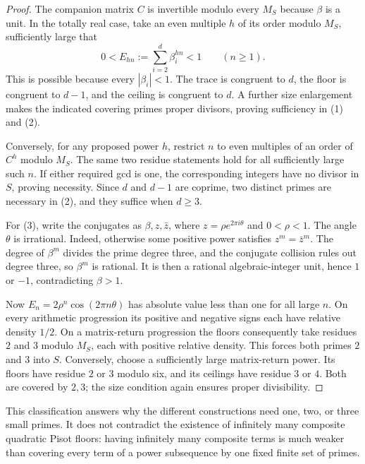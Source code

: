 \documentclass[11pt,a4paper]{article}
\theoremstyle{definition}
\theoremstyle{remark}
\numberwithin{equation}{section}
\begin{document}
\begin{proof}
The companion matrix $C$ is invertible modulo every $M_S$ because
$\beta$ is a unit.  In the totally real case, take an even multiple $h$
of its order modulo $M_S$, sufficiently large that
\[
 0<E_{hn}:=\sum_{i=2}^d\beta_i^{hn}<1
 \qquad(n\ge1).
\]
This is possible because every $|\beta_i|<1$.  The trace is congruent
to $d$, the floor is congruent to $d-1$, and the ceiling is congruent to
$d$.  A further size enlargement makes the indicated covering primes
proper divisors, proving sufficiency in (1) and (2).

Conversely, for any proposed power $h$, restrict $n$ to even multiples
of an order of $C^h$ modulo $M_S$.  The same two residue statements
hold for all sufficiently large such $n$.  If either required gcd is
one, the corresponding integers have no divisor in $S$, proving
necessity.  Since $d$ and $d-1$ are coprime, two distinct primes are
necessary in (2), and they suffice when $d\ge3$.

For (3), write the conjugates as $\beta,z,\bar z$, where
$z=\rho e^{2\pi i\theta}$ and $0<\rho<1$.  The angle $\theta$ is
irrational.  Indeed, otherwise some positive power satisfies
$z^m=\bar z^m$.  The degree of $\beta^m$ divides the prime degree three,
and the conjugate collision rules out degree three, so $\beta^m$ is
rational.  It is then a rational algebraic-integer unit, hence $1$ or
$-1$, contradicting $\beta>1$.

Now $E_n=2\rho^n\cos(2\pi n\theta)$ has absolute value less than one
for all large $n$.  On every arithmetic progression its positive and
negative signs each have relative density $1/2$.  On a matrix-return
progression the floors consequently take residues $2$ and $3$ modulo
$M_S$, each with positive relative density.  This forces both primes
$2$ and $3$ into $S$.  Conversely, choose a sufficiently large
matrix-return power.  Its floors have residue $2$ or $3$ modulo six,
and its ceilings have residue $3$ or $4$.  Both are covered by $2,3$;
the size condition again ensures proper divisibility.
\end{proof}

This classification answers why the different constructions need
one, two, or three small primes.  It does not contradict the existence
of infinitely many composite quadratic Pisot floors: having infinitely
many composite terms is much weaker than covering every term of a power
subsequence by one fixed finite set of primes.


\end{document}
